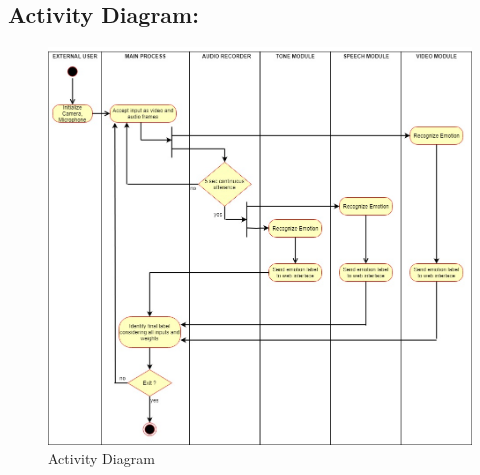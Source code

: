 \documentclass[oneside,a4paper,12pt]{report}
\begin{document}
\begin{normalsize}
 
\subsection{Activity Diagram:}
\begin{center}
	\begin{figure}[!htbp]
		\centering
		\includegraphics[width=\textwidth]{activity_proj.jpg}
		\caption{Activity Diagram}
		\label{fig:activitydiag}
	\end{figure}
\end{center}  


\end{normalsize}
\end{document}
